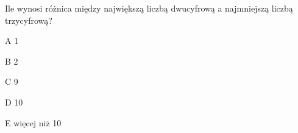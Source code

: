 \begin{tresc}
Ile wynosi różnica między największą liczbą dwucyfrową a najmniejszą liczbą trzycyfrową?
\end{tresc}
\begin{wariant}{A} 1 \end{wariant}
\begin{wariant}{B} 2 \end{wariant}
\begin{wariant}{C} 9 \end{wariant}
\begin{wariant}{D} 10 \end{wariant}
\begin{wariant}{E} więcej niż 10 \end{wariant}
